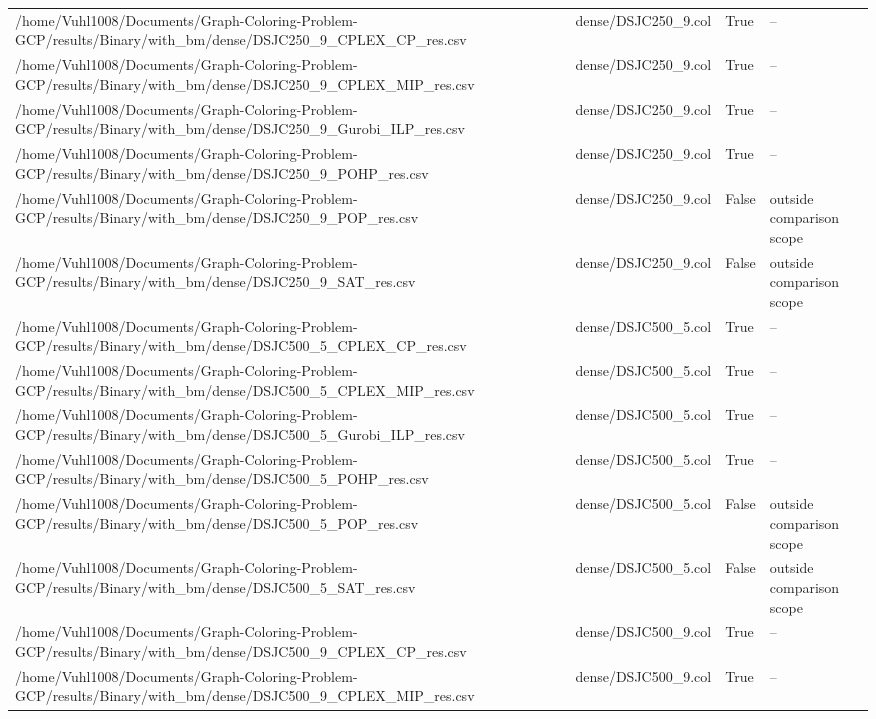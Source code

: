 \begin{table}[htbp]
\begin{tabular}{llll}
/home/Vuhl1008/Documents/Graph-Coloring-Problem-GCP/results/Binary/with\_bm/dense/DSJC250\_9\_CPLEX\_CP\_res.csv & dense/DSJC250\_9.col & True & -- \\
/home/Vuhl1008/Documents/Graph-Coloring-Problem-GCP/results/Binary/with\_bm/dense/DSJC250\_9\_CPLEX\_MIP\_res.csv & dense/DSJC250\_9.col & True & -- \\
/home/Vuhl1008/Documents/Graph-Coloring-Problem-GCP/results/Binary/with\_bm/dense/DSJC250\_9\_Gurobi\_ILP\_res.csv & dense/DSJC250\_9.col & True & -- \\
/home/Vuhl1008/Documents/Graph-Coloring-Problem-GCP/results/Binary/with\_bm/dense/DSJC250\_9\_POHP\_res.csv & dense/DSJC250\_9.col & True & -- \\
/home/Vuhl1008/Documents/Graph-Coloring-Problem-GCP/results/Binary/with\_bm/dense/DSJC250\_9\_POP\_res.csv & dense/DSJC250\_9.col & False & outside comparison scope \\
/home/Vuhl1008/Documents/Graph-Coloring-Problem-GCP/results/Binary/with\_bm/dense/DSJC250\_9\_SAT\_res.csv & dense/DSJC250\_9.col & False & outside comparison scope \\
/home/Vuhl1008/Documents/Graph-Coloring-Problem-GCP/results/Binary/with\_bm/dense/DSJC500\_5\_CPLEX\_CP\_res.csv & dense/DSJC500\_5.col & True & -- \\
/home/Vuhl1008/Documents/Graph-Coloring-Problem-GCP/results/Binary/with\_bm/dense/DSJC500\_5\_CPLEX\_MIP\_res.csv & dense/DSJC500\_5.col & True & -- \\
/home/Vuhl1008/Documents/Graph-Coloring-Problem-GCP/results/Binary/with\_bm/dense/DSJC500\_5\_Gurobi\_ILP\_res.csv & dense/DSJC500\_5.col & True & -- \\
/home/Vuhl1008/Documents/Graph-Coloring-Problem-GCP/results/Binary/with\_bm/dense/DSJC500\_5\_POHP\_res.csv & dense/DSJC500\_5.col & True & -- \\
/home/Vuhl1008/Documents/Graph-Coloring-Problem-GCP/results/Binary/with\_bm/dense/DSJC500\_5\_POP\_res.csv & dense/DSJC500\_5.col & False & outside comparison scope \\
/home/Vuhl1008/Documents/Graph-Coloring-Problem-GCP/results/Binary/with\_bm/dense/DSJC500\_5\_SAT\_res.csv & dense/DSJC500\_5.col & False & outside comparison scope \\
/home/Vuhl1008/Documents/Graph-Coloring-Problem-GCP/results/Binary/with\_bm/dense/DSJC500\_9\_CPLEX\_CP\_res.csv & dense/DSJC500\_9.col & True & -- \\
/home/Vuhl1008/Documents/Graph-Coloring-Problem-GCP/results/Binary/with\_bm/dense/DSJC500\_9\_CPLEX\_MIP\_res.csv & dense/DSJC500\_9.col & True & -- \\

\end{tabular}
\end{table}
